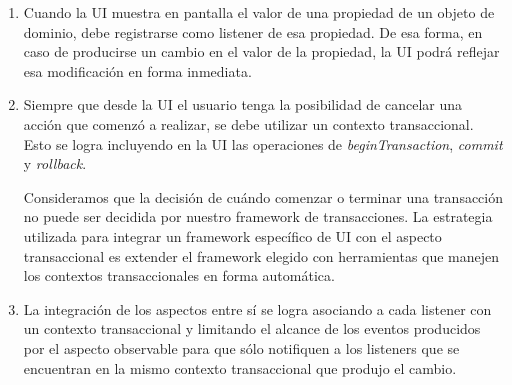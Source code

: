 		\begin{enumerate}
		  \item Cuando la UI muestra en pantalla el valor de una
		  propiedad de un objeto de dominio, debe registrarse como listener de esa
		  propiedad.
		  De esa forma, en caso de producirse un cambio en el valor de la propiedad, la
		  UI podrá reflejar esa modificación en forma inmediata.
		  
		  \item Siempre que desde la UI el usuario tenga la posibilidad de cancelar
		  una acción que comenzó a realizar, se debe utilizar un contexto
		  transaccional.
		  Esto se logra incluyendo en la UI las operaciones de
		  \emph{beginTransaction}, \emph{commit} y \emph{rollback}.
		  
		  Consideramos que la decisión de cuándo comenzar o terminar una transacción 
		  no puede ser decidida por nuestro framework de transacciones. 
		  La estrategia utilizada para integrar un framework
		  específico de UI con el aspecto transaccional es extender el framework
		  elegido con herramientas que manejen los contextos transaccionales en forma
		  automática.
		  
		  \item La integración de los aspectos entre sí se logra asociando a
		  cada listener con un contexto transaccional y limitando el alcance de los
		  eventos producidos por el aspecto observable para que sólo notifiquen a los
		  listeners que se encuentran en la mismo contexto transaccional que produjo el cambio.
		\end{enumerate}
